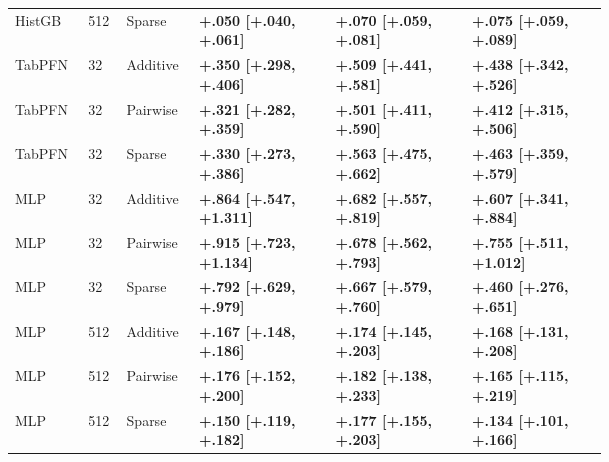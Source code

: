 \begin{longtable}{lllP{0.23\linewidth}P{0.23\linewidth}P{0.23\linewidth}}
HistGB & 512 & Sparse & \textbf{+.050 [+.040, +.061]} & \textbf{+.070 [+.059, +.081]} & \textbf{+.075 [+.059, +.089]} \\
\addlinespace[1pt]
TabPFN & 32 & Additive & \textbf{+.350 [+.298, +.406]} & \textbf{+.509 [+.441, +.581]} & \textbf{+.438 [+.342, +.526]} \\
TabPFN & 32 & Pairwise & \textbf{+.321 [+.282, +.359]} & \textbf{+.501 [+.411, +.590]} & \textbf{+.412 [+.315, +.506]} \\
TabPFN & 32 & Sparse & \textbf{+.330 [+.273, +.386]} & \textbf{+.563 [+.475, +.662]} & \textbf{+.463 [+.359, +.579]} \\
\addlinespace[1pt]
MLP & 32 & Additive & \textbf{+.864 [+.547, +1.311]} & \textbf{+.682 [+.557, +.819]} & \textbf{+.607 [+.341, +.884]} \\
MLP & 32 & Pairwise & \textbf{+.915 [+.723, +1.134]} & \textbf{+.678 [+.562, +.793]} & \textbf{+.755 [+.511, +1.012]} \\
MLP & 32 & Sparse & \textbf{+.792 [+.629, +.979]} & \textbf{+.667 [+.579, +.760]} & \textbf{+.460 [+.276, +.651]} \\
\addlinespace[1pt]
MLP & 512 & Additive & \textbf{+.167 [+.148, +.186]} & \textbf{+.174 [+.145, +.203]} & \textbf{+.168 [+.131, +.208]} \\
MLP & 512 & Pairwise & \textbf{+.176 [+.152, +.200]} & \textbf{+.182 [+.138, +.233]} & \textbf{+.165 [+.115, +.219]} \\
MLP & 512 & Sparse & \textbf{+.150 [+.119, +.182]} & \textbf{+.177 [+.155, +.203]} & \textbf{+.134 [+.101, +.166]} \\
\end{longtable}
